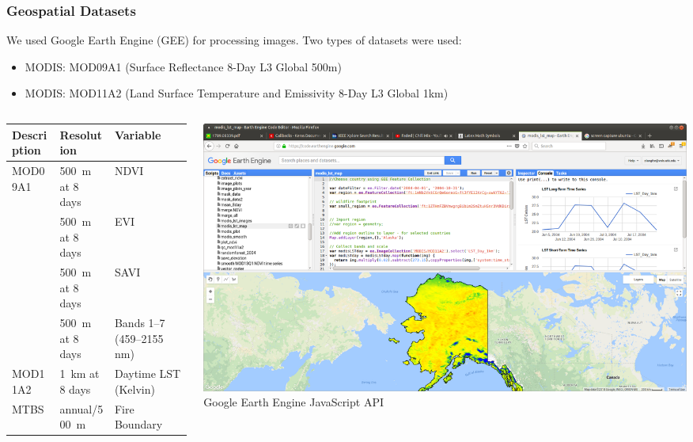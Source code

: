 \documentclass{beamer}
\begin{document}
\begin{frame}
  \frametitle{Geospatial Datasets}
  \vspace{-0.3cm}
\footnotesize
We used Google Earth Engine (GEE) for processing images. 
Two types of datasets were used:
\begin{itemize}
 \item MODIS: MOD09A1 (Surface Reflectance 8-Day L3 Global 500m)
  \item MODIS: MOD11A2 (Land Surface Temperature and Emissivity 8-Day L3 Global 1km)
\end{itemize}

\begin{columns}[T]
    \begin{column}{.4\textwidth}

  \tiny
        \begin{tabular}{p{10mm}p{10mm}p{15mm}} \toprule
        Description    & Resolution   & Variable \\ \midrule
        MOD09A1  

       & 500~m at 8 days & NDVI \\ \cmidrule(l){2-3}
       & 500~m at 8 days & EVI \\ \cmidrule(l){2-3}
       & 500~m at 8 days & SAVI \\ \cmidrule(l){2-3}

       & 500~m at 8 days & Bands 1--7 (459--2155 nm) \\ \cmidrule(l){1-3}
       MOD11A2
       & 1~km at 8 days & Daytime LST (Kelvin) \\ \cmidrule(l){1-3}
       MTBS
       & annual/500~m & Fire Boundary \\ \cmidrule(l){1-3}
       
       \bottomrule
    \end{tabular}
    \end{column}
    \begin{column}{.6\textwidth}

     \centering
\includegraphics[width=1.0\textwidth]{figs/gee_ak.png}
\\

Google Earth Engine JavaScript API

    \end{column}
  \end{columns}
   
\end{frame}
\end{document}
